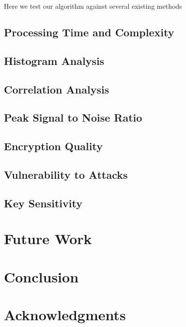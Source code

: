 \documentclass[conference]{IEEEtran}
\begin{document}
Here we test our algorithm against several existing methods

\subsection{Processing Time and Complexity}\label{subsec:processing-time-and-complexity}

\subsection{Histogram Analysis}\label{subsec:histogram-analysis}

\subsection{Correlation Analysis}\label{subsec:correlation-analysis}

\subsection{Peak Signal to Noise Ratio}\label{subsec:peak-signal-to-noise-ratio}

\subsection{Encryption Quality}\label{subsec:encryption-quality}

\subsection{Vulnerability to Attacks}\label{subsec:vulnerability-to-attacks}

\subsection{Key Sensitivity}\label{subsec:key-sensitivity}

\section{Future Work}\label{sec:future-work}

\section{Conclusion}\label{sec:conclusion}

\section{Acknowledgments}\label{sec:acknowledgments}



\end{document}
